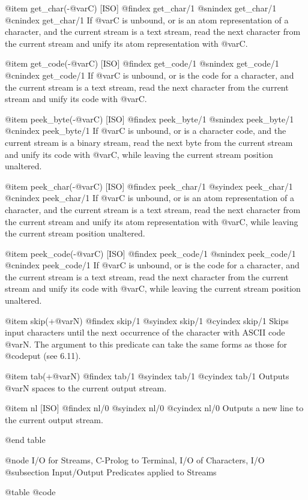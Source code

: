 {{{{{{@item get_char(-@var{C}) [ISO]
@findex get_char/1
@snindex get_char/1
@cnindex get_char/1
If @var{C} is unbound, or is an atom representation of a character, and
the current stream is a text stream, read the next character from the
current stream and unify its atom representation with @var{C}.

@item get_code(-@var{C}) [ISO]
@findex get_code/1
@snindex get_code/1
@cnindex get_code/1
If @var{C} is unbound, or is the code for a character, and
the current stream is a text stream, read the next character from the
current stream and unify its code with @var{C}.

@item peek_byte(-@var{C}) [ISO]
@findex peek_byte/1
@snindex peek_byte/1
@cnindex peek_byte/1
If @var{C} is unbound, or is a character code, and the current stream is a
binary stream, read the next byte from the current stream and unify its
code with @var{C}, while leaving the current stream position unaltered.

@item peek_char(-@var{C}) [ISO]
@findex peek_char/1
@syindex peek_char/1
@cnindex peek_char/1
If @var{C} is unbound, or is an atom representation of a character, and
the current stream is a text stream, read the next character from the
current stream and unify its atom representation with @var{C}, while
leaving the current stream position unaltered.

@item peek_code(-@var{C}) [ISO]
@findex peek_code/1
@snindex peek_code/1
@cnindex peek_code/1
If @var{C} is unbound, or is the code for a character, and
the current stream is a text stream, read the next character from the
current stream and unify its code with @var{C}, while
leaving the current stream position unaltered.

@item skip(+@var{N})
@findex skip/1
@syindex skip/1
@cyindex skip/1
Skips input characters until the next occurrence of the character with
ASCII code @var{N}. The argument to this predicate can take the same forms
as those for @code{put} (see 6.11).

@item tab(+@var{N})
@findex tab/1
@syindex tab/1
@cyindex tab/1
Outputs @var{N} spaces to the current output stream.

@item nl [ISO]
@findex nl/0
@syindex nl/0
@cyindex nl/0
Outputs a new line to the current output stream.

@end table

@node I/O for Streams, C-Prolog to Terminal, I/O of Characters, I/O
@subsection Input/Output Predicates applied to Streams

@table @code

}}}}}}
